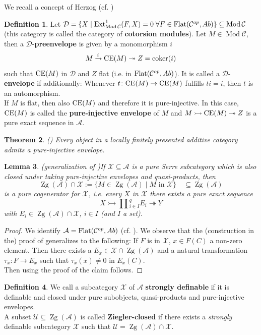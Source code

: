 \documentclass[11pt,a4paper]{amsart}
\theoremstyle{plain}
\newtheorem{thm}{Theorem}[section]
\newtheorem{lem}[thm]{Lemma}
\theoremstyle{definition}
\newtheorem{dfn}[thm]{Definition}
\DeclareMathOperator{\Ext}{Ext}
\DeclareMathOperator{\Modu}{Mod}
\DeclareMathOperator{\coKer}{coker}
\newcommand{\defl}{\twoheadrightarrow}
\newcommand{\infl}{\rightarrowtail}
\newcommand{\mcA}{\mathcal{A}}
\newcommand{\mcC}{\mathcal{C}}
\newcommand{\mcD}{\mathcal{D}}
\newcommand{\mcU}{\mathcal{U}}
\newcommand{\mcX}{\mathcal{X}}
\DeclareMathOperator{\Zg}{Zg}
\begin{document}
We recall a concept of Herzog (cf. \cite{Her})
\begin{dfn} 
Let $\mcD=\{X \mid \Ext^1_{\Modu \mcC} (F,X)=0 \; \forall F \in {\rm Flat}(\mcC^{op}, Ab)\}\subseteq \Modu \mcC$ (this category is called the category of \textbf{cotorsion modules}). Let $M\in \Modu \mcC$, then a $\mcD$-\textbf{preenvelope} is given by a monomorphism $i$ 
\[
M \xrightarrow{i} {\rm CE}(M) \defl Z=\coKer (i)
\]
such that ${\rm CE}(M)$ in $\mcD$ and $Z$ flat (i.e. in ${\rm Flat}(\mcC^{op}, Ab)$). It is called a $\mcD$-\textbf{envelope} if additionally: Whenever $t \colon {\rm CE}(M)\to {\rm CE}(M)$ fulfills $ti=i$, then $t$ is an automorphism. \\
If $M$ is flat, then also ${\rm CE}(M)$ and therefore it is pure-injective. In this case, ${\rm CE}(M)$ is called the \textbf{pure-injective envelope} of $M$ and $M \infl {\rm CE} (M) \defl Z$ is a pure exact sequence in $\mcA$.  
\end{dfn}

\begin{thm} (\cite[Thm 6]{Her}) Every object in a locally finitely presented additive category admits a pure-injective envelope. 
\end{thm}

\begin{lem} (generalization of \cite[Thm 3, Thm 4]{BeG})\label{pureCogen}
If $\mcX\subseteq \mcA$ is a pure Serre subcategory which is also closed under taking pure-injective envelopes and quasi-products, then 
\[
\Zg(\mcA) \cap \mcX :=\{ M\in \Zg(\mcA)\mid M\text{ in }\mcX\} \quad \subseteq \Zg(\mcA)
\]
is a pure cogenerator for $\mcX$, i.e. every $X$ in $\mcX$ there exists a pure exact sequence 
\[
X\infl \prod{}^q_{i\in I} E_i \defl Y
\]
with $E_i\in \Zg(\mcA) \cap \mcX$, $i \in I$ (and $I$ a set). 
\end{lem}

\begin{proof}
We identify $\mcA={\rm Flat} (\mcC^{op}, Ab)$ (cf. \cite[Thm 3]{CB}). 
We observe that the (construction in the) proof of \cite[Thm 3]{BeG} generalizes to the following: If $F$ is in $\mcX$, $x\in F(C)$ a non-zero element. Then there exists a $E_x\in \mcX\cap \Zg(\mcA)$ and a natural transformation $\tau_x\colon F\to E_x$ such that $\tau_x(x)\neq 0$ in $E_x(C)$.\\ 
Then using the proof of \cite[Thm 4]{BeG} the claim follows.       
\end{proof}

\begin{dfn}
We call a subcategory $\mcX$ of $\mcA$ \textbf{strongly definable} if it is definable and closed under pure subobjects, quasi-products and pure-injective envelopes. \\
A subset $\mcU \subseteq \Zg (\mcA)$ is called \textbf{Ziegler-closed} if there exists a \emph{strongly} definable subcategory $\mcX$ such that $\mcU= \Zg (\mcA)\cap \mcX$.     
\end{dfn}
\end{document}
